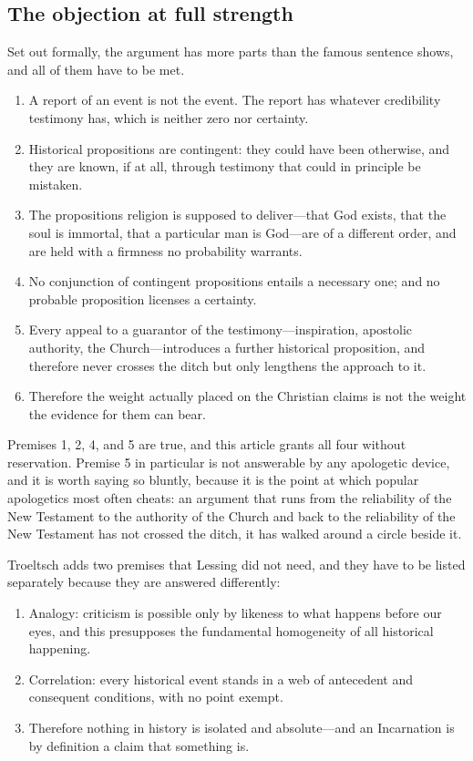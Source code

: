 \subsection{The objection at full strength}

Set out formally, the argument has more parts than the famous sentence shows, and all of them have to be met.

\begin{enumerate}[leftmargin=1.6em,itemsep=0.2em]
\item A report of an event is not the event. The report has whatever credibility testimony has, which is neither zero nor certainty.
\item Historical propositions are contingent: they could have been otherwise, and they are known, if at all, through testimony that could in principle be mistaken.
\item The propositions religion is supposed to deliver---that God exists, that the soul is immortal, that a particular man is God---are of a different order, and are held with a firmness no probability warrants.
\item No conjunction of contingent propositions entails a necessary one; and no probable proposition licenses a certainty.
\item Every appeal to a guarantor of the testimony---inspiration, apostolic authority, the Church---introduces a further historical proposition, and therefore never crosses the ditch but only lengthens the approach to it.
\item Therefore the weight actually placed on the Christian claims is not the weight the evidence for them can bear.
\end{enumerate}

Premises 1, 2, 4, and 5 are true, and this article grants all four without reservation. Premise 5 in particular is not answerable by any apologetic device, and it is worth saying so bluntly, because it is the point at which popular apologetics most often cheats: an argument that runs from the reliability of the New Testament to the authority of the Church and back to the reliability of the New Testament has not crossed the ditch, it has walked around a circle beside it.

Troeltsch adds two premises that Lessing did not need, and they have to be listed separately because they are answered differently:

\begin{enumerate}[leftmargin=1.6em,itemsep=0.2em,start=7]
\item Analogy: criticism is possible only by likeness to what happens before our eyes, and this presupposes the fundamental homogeneity of all historical happening.
\item Correlation: every historical event stands in a web of antecedent and consequent conditions, with no point exempt.
\item Therefore nothing in history is isolated and absolute---and an Incarnation is by definition a claim that something is.
\end{enumerate}

